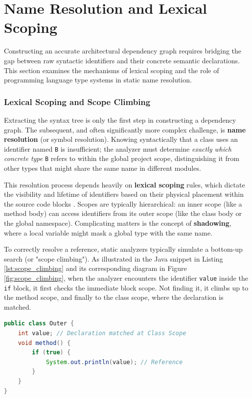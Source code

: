 \section{Name Resolution and Lexical Scoping}
\label{sec:name_resolution}

Constructing an accurate architectural dependency graph requires bridging
the gap between raw syntactic identifiers and their concrete semantic
declarations. This section examines the mechanisms of lexical scoping and
the role of programming language type systems in static name resolution.

\subsubsection{Lexical Scoping and Scope Climbing}
\label{sec:lexical_scoping}

Extracting the syntax tree is only the first step in constructing a
dependency graph. The subsequent, and often significantly more
complex challenge, is \textbf{name resolution} (or symbol
resolution). Knowing syntactically that a class uses an identifier
named \texttt{B} is insufficient; the analyzer must determine
\textit{exactly which concrete type} \texttt{B} refers to within the
global project scope, distinguishing it from other types that might
share the same name in different modules.

This resolution process depends heavily on \textbf{lexical scoping}
rules, which dictate the visibility and lifetime of identifiers based
on their physical placement within the source code blocks
\cite{scott_programming_2016}. Scopes are typically
hierarchical: an inner scope (like a method body) can access
identifiers from its outer scope (like the class body or the global
namespace). Complicating matters is the concept of
\textbf{shadowing}, where a local variable might mask a global type
with the same name.

To correctly resolve a reference, static analyzers typically simulate
a bottom-up search (or "scope climbing"). As illustrated in the Java
snippet in Listing \ref{lst:scope_climbing} and its corresponding
diagram in Figure \ref{fig:scope_climbing}, when the analyzer
encounters the identifier \texttt{value} inside the \texttt{if} block,
it first checks the immediate block scope. Not finding it, it climbs
up to the method scope, and finally to the class scope, where the
declaration is matched.

\begin{lstlisting}[language=Java,caption={A simple Java class illustrating nested scopes.},label={lst:scope_climbing}]
public class Outer {
    int value; // Declaration matched at Class Scope
    void method() {
        if (true) {
            System.out.println(value); // Reference
        }
    }
}
\end{lstlisting}

